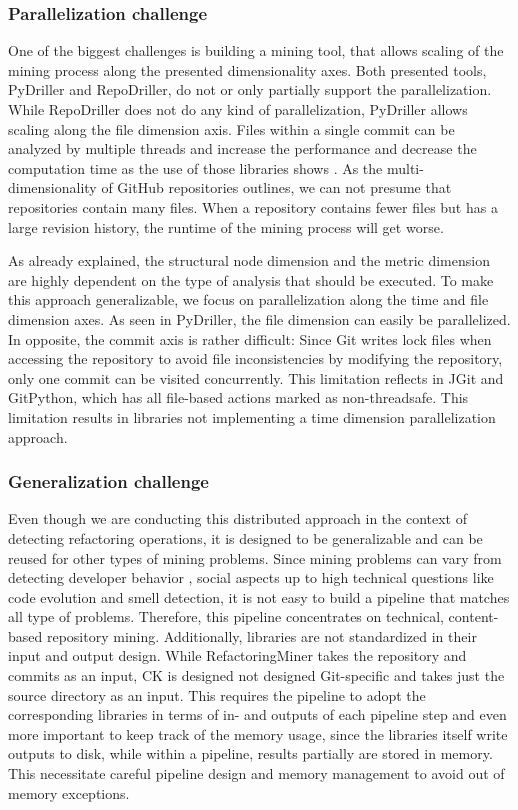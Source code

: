 \subsubsection{Parallelization challenge}
One of the biggest challenges is building a mining tool, that allows scaling of the mining process along the presented dimensionality axes. Both presented tools, PyDriller and RepoDriller, do not or only partially support the parallelization. While RepoDriller does not do any kind of parallelization, PyDriller allows scaling along the file dimension axis. Files within a single commit can be analyzed by multiple threads and increase the performance and decrease the computation time as the use of those libraries shows \cite{Gote2019}. As the multi-dimensionality of GitHub repositories outlines, we can not presume that repositories contain many files. When a repository contains fewer files but has a large revision history, the runtime of the mining process will get worse.

As already explained, the structural node dimension and the metric dimension are highly dependent on the type of analysis that should be executed. To make this approach generalizable, we focus on parallelization along the time and file dimension axes. As seen in PyDriller, the file dimension can easily be parallelized. In opposite, the commit axis is rather difficult: Since Git writes lock files when accessing the repository to avoid file inconsistencies by modifying the repository, only one commit can be visited concurrently. This limitation reflects in JGit and GitPython, which has all file-based actions marked as non-threadsafe. This limitation results in libraries not implementing a time dimension parallelization approach.

\subsubsection{Generalization challenge}
Even though we are conducting this distributed approach in the context of detecting refactoring operations, it is designed to be generalizable and can be reused for other types of mining problems. Since mining problems can vary from detecting developer behavior \cite{}, social aspects \cite{} up to high technical questions like code evolution \cite{} and smell detection\cite{}, it is not easy to build a pipeline that matches all type of problems. Therefore, this pipeline concentrates on technical, content-based repository mining. Additionally, libraries are not standardized in their input and output design. While RefactoringMiner takes the repository and commits as an input, CK is designed not designed Git-specific and takes just the source directory as an input. This requires the pipeline to adopt the corresponding libraries in terms of in- and outputs of each pipeline step and even more important to keep track of the memory usage, since the libraries itself write outputs to disk, while within a pipeline, results partially are stored in memory. This necessitate careful pipeline design and memory management to avoid out of memory exceptions.